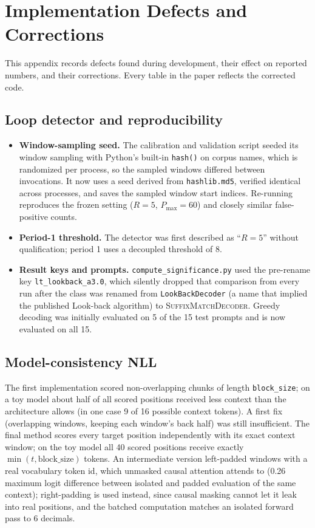 \section{Implementation Defects and Corrections}
\label{app:defects}

This appendix records defects found during development, their effect on reported numbers, and their corrections. Every table in the paper reflects the corrected code.

\subsection*{Loop detector and reproducibility}
\begin{itemize}[leftmargin=*]
  \item \textbf{Window-sampling seed.} The calibration and validation script seeded its window sampling with Python's built-in \texttt{hash()} on corpus names, which is randomized per process, so the sampled windows differed between invocations. It now uses a seed derived from \texttt{hashlib.md5}, verified identical across processes, and saves the sampled window start indices. Re-running reproduces the frozen setting ($R{=}5$, $P_{\max}{=}60$) and closely similar false-positive counts.
  \item \textbf{Period-1 threshold.} The detector was first described as ``$R{=}5$'' without qualification; period 1 uses a decoupled threshold of 8.
  \item \textbf{Result keys and prompts.} \texttt{compute\_\allowbreak{}significance.py} used the pre-rename key \texttt{lt\_lookback\_a3.0}, which silently dropped that comparison from every run after the class was renamed from \texttt{LookBackDecoder} (a name that implied the published Look-back algorithm) to \textsc{SuffixMatchDecoder}. Greedy decoding was initially evaluated on 5 of the 15 test prompts and is now evaluated on all 15.
\end{itemize}

\subsection*{Model-consistency NLL}
The first implementation scored non-overlapping chunks of length \texttt{block\_\allowbreak{}size}; on a toy model about half of all scored positions received less context than the architecture allows (in one case 9 of 16 possible context tokens). A first fix (overlapping windows, keeping each window's back half) was still insufficient. The final method scores every target position independently with its exact context window; on the toy model all 40 scored positions receive exactly $\min(t,\text{block\_size})$ tokens. An intermediate version left-padded windows with a real vocabulary token id, which unmasked causal attention attends to (0.26 maximum logit difference between isolated and padded evaluation of the same context); right-padding is used instead, since causal masking cannot let it leak into real positions, and the batched computation matches an isolated forward pass to 6 decimals.

